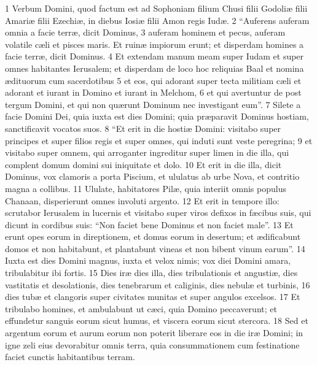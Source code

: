 
\ifcontext{\startlinenumbering}

1 Verbum Domini, quod factum est ad Sophoniam filium Chusi filii Godoliæ filii Amariæ filii Ezechiæ, in diebus Iosiæ filii Amon regis Iudæ. 2 “Auferens auferam omnia a facie terræ, dicit Dominus, 3 auferam hominem et pecus, auferam volatile cæli et pisces maris. Et ruinæ impiorum erunt; et disperdam homines a facie terræ, dicit Dominus. 4 Et extendam manum meam super Iudam et super omnes habitantes Ierusalem; et disperdam de loco hoc reliquias Baal et nomina ædituorum cum sacerdotibus 5 et eos, qui adorant super tecta militiam cæli et adorant et iurant in Domino et iurant in Melchom, 6 et qui avertuntur de post tergum Domini, et qui non quærunt Dominum nec investigant eum”. 7 Silete a facie Domini Dei, quia iuxta est dies Domini; quia præparavit Dominus hostiam, sanctificavit vocatos suos. 8 “Et erit in die hostiæ Domini: visitabo super principes et super filios regis et super omnes, qui induti sunt veste peregrina; 9 et visitabo super omnem, qui arroganter ingreditur super limen in die illa, qui complent domum domini sui iniquitate et dolo. 10 Et erit in die illa, dicit Dominus, vox clamoris a porta Piscium, et ululatus ab urbe Nova, et contritio magna a collibus. 11 Ululate, habitatores Pilæ, quia interiit omnis populus Chanaan, disperierunt omnes involuti argento. 12 Et erit in tempore illo: scrutabor Ierusalem in lucernis et visitabo super viros defixos in fæcibus suis, qui dicunt in cordibus suis: “Non faciet bene Dominus et non faciet male”. 13 Et erunt opes eorum in direptionem, et domus eorum in desertum; et ædificabunt domos et non habitabunt, et plantabunt vineas et non bibent vinum earum”. 14 Iuxta est dies Domini magnus, iuxta et velox nimis; vox diei Domini amara, tribulabitur ibi fortis. 15 Dies iræ dies illa, dies tribulationis et angustiæ, dies vastitatis et desolationis, dies tenebrarum et caliginis, dies nebulæ et turbinis, 16 dies tubæ et clangoris super civitates munitas et super angulos excelsos. 17 Et tribulabo homines, et ambulabunt ut cæci, quia Domino peccaverunt; et effundetur sanguis eorum sicut humus, et viscera eorum sicut stercora. 18 Sed et argentum eorum et aurum eorum non poterit liberare eos in die iræ Domini; in igne zeli eius devorabitur omnis terra, quia consummationem cum festinatione faciet cunctis habitantibus terram.

